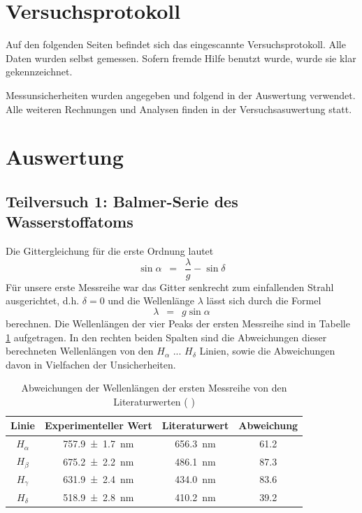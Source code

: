 \documentclass{article}
\newcommand{\widespace}{\enspace}
\newcommand{\wideeq}{\widespace = \widespace}
\newcommand{\coderef}[1]{%
    \text{\footnotesize \colorbox{codebg}{\texttt{#1()}}}%
}
\begin{document}
\newpage

\section{Versuchsprotokoll}

Auf den folgenden Seiten befindet sich das eingescannte Versuchsprotokoll.
Alle Daten wurden selbst gemessen. Sofern fremde Hilfe benutzt wurde,
wurde sie klar gekennzeichnet.

Messunsicherheiten wurden angegeben und folgend in der Auswertung verwendet.
Alle weiteren Rechnungen und Analysen finden in der Versuchsasuwertung statt.



\newpage

\section{Auswertung}

\subsection{Teilversuch 1: Balmer-Serie des Wasserstoffatoms}

Die Gittergleichung für die erste Ordnung lautet
\[
    \sin \alpha \wideeq \frac \lambda g - \sin \delta
\]
Für unsere erste Messreihe war das Gitter senkrecht zum einfallenden Strahl
ausgerichtet, d.h. $\delta = 0$ und die Wellenlänge $\lambda$ lässt sich
durch die Formel
\[
    \lambda \wideeq g \sin \alpha
\]
berechnen. Die Wellenlängen der vier Peaks der ersten Messreihe
sind in Tabelle \ref{TV1_Messreihe1} aufgetragen.
In den rechten beiden Spalten sind die Abweichungen dieser berechneten
Wellenlängen von den $H_\alpha$ ... $H_\delta$ Linien, sowie die
Abweichungen davon in Vielfachen der Unsicherheiten.

\begin{table}[H]
    \centering
    \begin{tabular}{c|c|c|c}
        Linie & Experimenteller Wert & Literaturwert & Abweichung \\
        \hline
        $H_\alpha$ & \qty{757.9 \pm 1.7}{\nm} & \qty{656.3}{\nm} & \num{61.2}\\
        $H_\beta$  & \qty{675.2 \pm 2.2}{\nm} & \qty{486.1}{\nm} & \num{87.3} \\
        $H_\gamma$ & \qty{631.9 \pm 2.4}{\nm} & \qty{434.0}{\nm} & \num{83.6} \\
        $H_\delta$ & \qty{518.9 \pm 2.8}{\nm} & \qty{410.2}{\nm} & \num{39.2}
    \end{tabular}
    \caption{Abweichungen der Wellenlängen der ersten Messreihe
    von den Literaturwerten (\coderef{tv1})}
    \label{TV1_Messreihe1}
\end{table}
\end{document}
